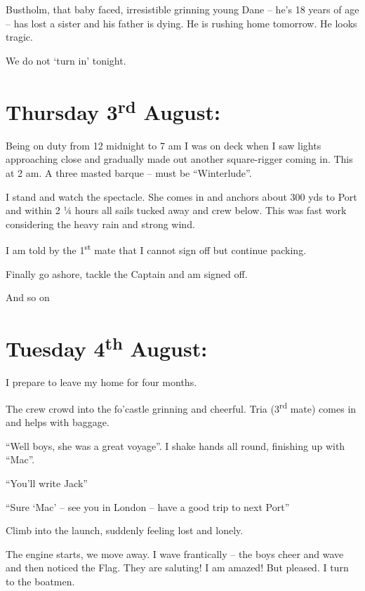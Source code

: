 \documentclass[
  11pt,
  msmallroyalvopaper
]{memoir}
\begin{document}
Bustholm, that baby faced, irresistible grinning young Dane -- he's 18
years of age -- has lost a sister and his father is dying. He is rushing
home tomorrow. He looks tragic.

We do not `turn in' tonight.

\hypertarget{thursday-3rd-august}{%
\section{\texorpdfstring{Thursday 3\textsuperscript{rd}
August:}{Thursday 3rd August:}}\label{thursday-3rd-august}}

Being on duty from 12 midnight to 7 am I was on deck when I saw lights
approaching close and gradually made out another square-rigger coming
in. This at 2 am. A three masted barque -- must be ``Winterlude''.

I stand and watch the spectacle. She comes in and anchors about 300 yds
to Port and within 2 ¼ hours all sails tucked away and crew below. This
was fast work considering the heavy rain and strong wind.

I am told by the 1\textsuperscript{st} mate that I cannot sign off but
continue packing.

Finally go ashore, tackle the Captain and am signed off.

And so on

\hypertarget{tuesday-4th-august}{%
\section{\texorpdfstring{Tuesday 4\textsuperscript{th}
August:}{Tuesday 4th August:}}\label{tuesday-4th-august}}

I prepare to leave my home for four months.

The crew crowd into the fo'castle grinning and cheerful. Tria
(3\textsuperscript{rd} mate) comes in and helps with baggage.

``Well boys, she was a great voyage''. I shake hands all round,
finishing up with ``Mac''.

``You'll write Jack''

``Sure `Mac' -- see you in London -- have a good trip to next Port''

Climb into the launch, suddenly feeling lost and lonely.

The engine starts, we move away. I wave frantically -- the boys cheer
and wave and then noticed the Flag. They are saluting! I am amazed! But
pleased. I turn to the boatmen.
\end{document}

